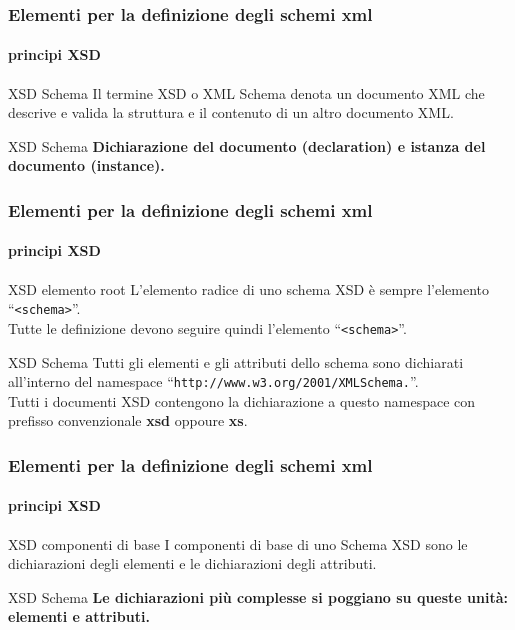 \begin{frame}
    \frametitle{Elementi per la definizione degli schemi xml}
    \framesubtitle{principi XSD}
    \addtocounter{nframe}{1}

    \begin{block}{XSD Schema}
        Il termine XSD o XML Schema denota un documento XML che descrive e valida la struttura e il contenuto di un altro documento XML.
    \end{block}

    \begin{block}{XSD Schema}
        \textbf{Dichiarazione del documento (declaration) e istanza del documento (instance).}
    \end{block}
    
\end{frame}

\begin{frame}
    \frametitle{Elementi per la definizione degli schemi xml}
    \framesubtitle{principi XSD}
    \addtocounter{nframe}{1}

    \begin{block}{XSD elemento root}
        L'elemento radice di uno schema XSD è sempre l'elemento ``\texttt{<schema>}''. 
        \\ Tutte le definizione devono seguire quindi l'elemento ``\texttt{<schema>}''.
    \end{block}

    \begin{block}{XSD Schema}
        Tutti gli elementi e gli attributi dello schema sono dichiarati all'interno del namespace ``\texttt{http://www.w3.org/2001/XMLSchema.}''. 
        \\ Tutti i documenti XSD contengono la dichiarazione a questo namespace con prefisso convenzionale \textbf{xsd} oppoure \textbf{xs}.
    \end{block}
    
\end{frame}

\begin{frame}
    \frametitle{Elementi per la definizione degli schemi xml}
    \framesubtitle{principi XSD}
    \addtocounter{nframe}{1}

    \begin{block}{XSD componenti di base}
       I componenti di base di uno Schema XSD sono le dichiarazioni degli elementi e le dichiarazioni degli attributi.
    \end{block}

    \begin{block}{XSD Schema}
        \textbf{Le dichiarazioni più complesse si poggiano su queste unità: elementi e attributi.}    
    \end{block}
    
\end{frame}

